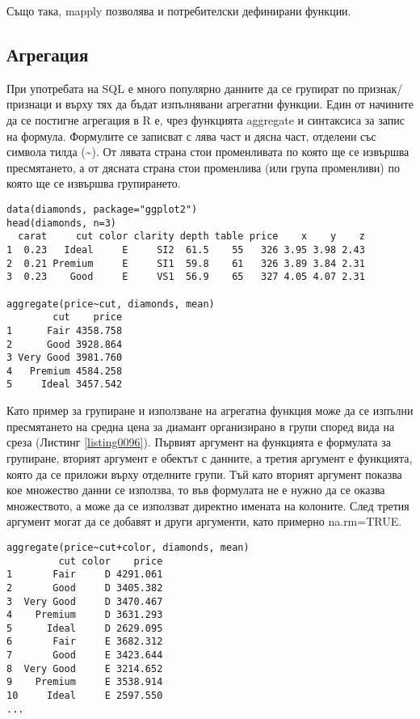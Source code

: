 Също така, mapply позволява и потребителски дефинирани функции.

\subsection{Агрегация}

При употребата на SQL е много популярно данните да се групират по признак/признаци и върху тях да бъдат изпълнявани агрегатни функции. Един от начините да се постигне агрегация в R е, чрез функцията aggregate и синтаксиса за запис на формула. Формулите се записват с лява част и дясна част, отделени със символа тилда (\textasciitilde). От лявата страна стои променливата по която ще се извършва пресмятането, а от дясната страна стои променлива (или група променливи) по която ще се извършва групирането. 

\begin{lstlisting}[caption=Групиране на данни, label=listing0096]
data(diamonds, package="ggplot2")
head(diamonds, n=3)
  carat     cut color clarity depth table price    x    y    z
1  0.23   Ideal     E     SI2  61.5    55   326 3.95 3.98 2.43
2  0.21 Premium     E     SI1  59.8    61   326 3.89 3.84 2.31
3  0.23    Good     E     VS1  56.9    65   327 4.05 4.07 2.31

aggregate(price~cut, diamonds, mean)
        cut    price
1      Fair 4358.758
2      Good 3928.864
3 Very Good 3981.760
4   Premium 4584.258
5     Ideal 3457.542
\end{lstlisting}

Като пример за групиране и използване на агрегатна функция може да се изпълни пресмятането на средна цена за диамант организирано в групи според вида на среза (Листинг \ref{listing0096}). Първият аргумент на функцията е формулата за групиране, вторият аргумент е обектът с данните, а третия аргумент е функцията, която да се приложи върху отделните групи. Тъй като вторият аргумент показва кое множество данни се използва, то във формулата не е нужно да се оказва множеството, а може да се използват директно имената на колоните. След третия аргумент могат да се добавят и други аргументи, като примерно na.rm=TRUE. 

\begin{lstlisting}[caption=Групиране по повече от една колона, label=listing0097]
aggregate(price~cut+color, diamonds, mean)
         cut color    price
1       Fair     D 4291.061
2       Good     D 3405.382
3  Very Good     D 3470.467
4    Premium     D 3631.293
5      Ideal     D 2629.095
6       Fair     E 3682.312
7       Good     E 3423.644
8  Very Good     E 3214.652
9    Premium     E 3538.914
10     Ideal     E 2597.550
...
\end{lstlisting}

